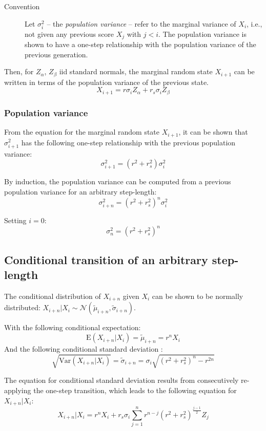 \documentclass[a4paper,11pt]{article}
\begin{document}
\begin{description}
\item [Convention] Let $\sigma_i^2$ -- the \emph{population variance} -- refer to the marginal variance of $X_i$, i.e., not given any previous score $X_{j}$ with $j<i$. The population variance is shown to have a one-step relationship with the population variance of the previous generation.
\end{description}

Then, for $Z_\alpha$, $Z_\beta$ iid standard normals, the marginal random state $X_{i+1}$ can be written in terms of the population variance of the previous state.
$$X_{i+1} = r\sigma_iZ_\alpha + r_s\sigma_iZ_\beta$$

\subsubsection{Population variance}
From the equation for the marginal random state $X_{i+1}$, it can be shown that $\sigma_{i+1}^2$ has the following one-step relationship with the previous population variance:
$$\sigma_{i+1}^2 = (r^2+r_s^2)  \sigma_i^2$$

By induction, the population variance can be computed from a previous population variance for an arbitrary step-length:
$$\sigma_{i+n}^2 = (r^2+r_s^2)^n  \sigma_{i}^2$$

Setting $i=0$:
$$\sigma_n^2 = (r^2+r_s^2)^n$$


\subsection{Conditional transition of an arbitrary step-length}

The conditional distribution of $X_{i+n}$ given $X_i$ can be shown to be normally distributed: $X_{i+n}|X_i \sim \mathcal{N}( \tilde{\mu}_{i+n}, \tilde{\sigma}_{i+n})$.

With the following conditional expectation:
$$\mathrm{E}(X_{i+n}|X_i) = \tilde{\mu}_{i+n} = r^nX_i$$
And the following conditional standard deviation :
$$\sqrt{\mathrm{Var}(X_{i+n}|X_i)} = \tilde{\sigma}_{i+n} = \sigma_i \sqrt{(r^2+r_s^2)^n-r^{2n}}$$

The equation for conditional standard deviation results from consecutively re-applying the one-step transition, which leads to the following equation for $X_{i+n}|X_i$:
$$X_{i+n}|X_i = r^nX_i + r_s\sigma_i \sum_{j=1}^{n}r^{n-j}(r^2+r_s^2)^{\frac{j-1}{2}}Z_j$$
\end{document}
